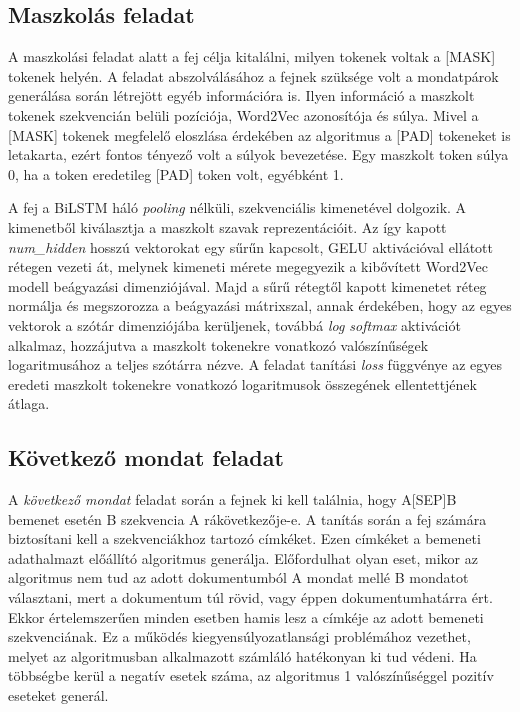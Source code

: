 \subsection{Maszkolás feladat}

A maszkolási feladat alatt a fej célja kitalálni, milyen tokenek voltak a [MASK] tokenek helyén. A feladat abszolválásához a fejnek szüksége volt a mondatpárok generálása során létrejött egyéb információra is. Ilyen információ a maszkolt tokenek szekvencián belüli pozíciója, Word2Vec azonosítója és súlya. Mivel a [MASK] tokenek megfelelő eloszlása érdekében az algoritmus a [PAD] tokeneket is letakarta, ezért fontos tényező volt a súlyok bevezetése. Egy maszkolt token súlya 0, ha a token eredetileg [PAD] token volt, egyébként 1. 

A fej a BiLSTM háló \textit{pooling} nélküli, szekvenciális kimenetével dolgozik. A kimenetből kiválasztja a maszkolt szavak reprezentációit. Az így kapott \textit{num\_hidden} hosszú vektorokat egy sűrűn kapcsolt, GELU aktivációval \cite{gelu} ellátott rétegen vezeti át, melynek kimeneti mérete megegyezik a kibővített Word2Vec modell beágyazási dimenziójával. Majd a sűrű rétegtől kapott kimenetet réteg normálja \cite{layer} és megszorozza a beágyazási mátrixszal, annak érdekében, hogy az egyes vektorok a szótár dimenziójába kerüljenek, továbbá \textit{log softmax} aktivációt alkalmaz, hozzájutva a maszkolt tokenekre vonatkozó valószínűségek logaritmusához a teljes szótárra nézve. A feladat tanítási \textit{loss} függvénye az egyes eredeti maszkolt tokenekre vonatkozó logaritmusok összegének ellentettjének átlaga.


\subsection{Következő mondat feladat}

A \textit{következő mondat} feladat során a fejnek ki kell találnia, hogy A[SEP]B bemenet esetén B szekvencia A rákövetkezője-e. A tanítás során a fej számára biztosítani kell a szekvenciákhoz tartozó címkéket. Ezen címkéket a bemeneti adathalmazt előállító algoritmus generálja. Előfordulhat olyan eset, mikor az algoritmus nem tud az adott dokumentumból A mondat mellé B mondatot választani, mert a dokumentum túl rövid, vagy éppen dokumentumhatárra ért. Ekkor értelemszerűen minden esetben hamis lesz a címkéje az adott bemeneti szekvenciának. Ez a működés kiegyensúlyozatlansági problémához vezethet, melyet az algoritmusban alkalmazott számláló hatékonyan ki tud védeni. Ha többségbe kerül a negatív esetek száma, az algoritmus 1 valószínűséggel pozitív eseteket generál. 

